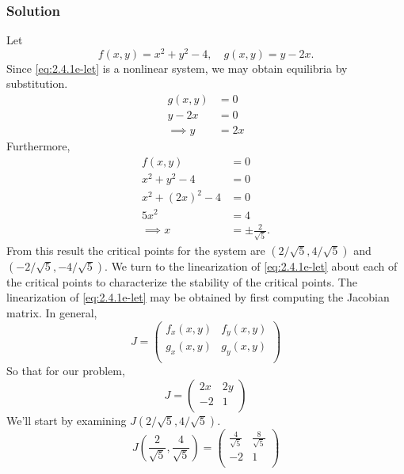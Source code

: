 \documentclass[12pt,twoside]{article}
\begin{document}
\subsubsection*{Solution}
Let
\begin{equation}
  \label{eq:2.4.1e-let}
  f(x,y)=x^2+y^2-4,\quad g(x,y)=y-2x.
\end{equation}
Since \cref{eq:2.4.1e-let} is a nonlinear system, we may obtain equilibria by
substitution.
\begin{equation*}
  \begin{aligned}
    g(x,y) &= 0 \\
    y - 2x &= 0 \\
    \implies y &= 2x
  \end{aligned}
\end{equation*}
Furthermore,
\begin{equation*}
  \begin{aligned}
    f(x,y) &= 0 \\
    x^2+y^2-4 &= 0 \\
    x^2 + {(2x)}^2 - 4 &= 0 \\
    5x^2 &= 4 \\
    \implies x &= \pm\frac{2}{\sqrt{5}}.
  \end{aligned}
\end{equation*}
From this result the critical points for the system are
$(2/\sqrt{5},4/\sqrt{5})$ and $(-2/\sqrt{5},-4/\sqrt{5})$. We turn to the
linearization of \cref{eq:2.4.1e-let} about each of the critical points to
characterize the stability of the critical points. The linearization of
\cref{eq:2.4.1e-let} may be obtained by first computing the Jacobian matrix. In
general,
\begin{equation*}
  J =
  \begin{pmatrix}
    f_x(x,y) & f_y(x,y) \\
    g_x(x,y) & g_y(x,y) \\
  \end{pmatrix}
\end{equation*}
So that for our problem,
\begin{equation*}
  J =
  \begin{pmatrix}
    2x & 2y \\ -2 & 1 \\
  \end{pmatrix}
\end{equation*}
We'll start by examining $J(2/\sqrt{5},4/\sqrt{5})$.
\begin{equation*}
  J\left(\frac{2}{\sqrt{5}},\frac{4}{\sqrt{5}}\right) =
  \begin{pmatrix}
    \frac{4}{\sqrt{5}} & \frac{8}{\sqrt{5}} \\ -2 & 1 \\
  \end{pmatrix}
\end{equation*}
\end{document}
